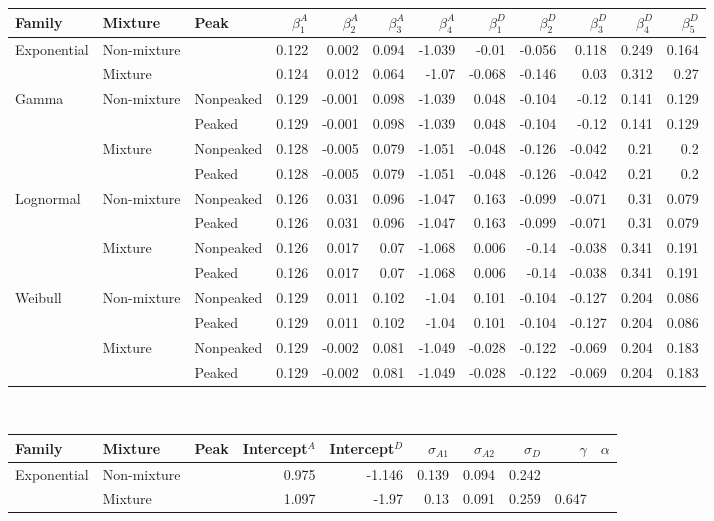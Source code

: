 \documentclass[useAMS,usenatbib,referee,12pt]{article}
\begin{document}
\begin{table}\footnotesize
\centering
\begin{tabular}{lll|rrrr|rrrrr}
  \hline
Family & Mixture & Peak & $\beta^A_1$ & $\beta^A_2$ & $\beta^A_3$ & $\beta^A_4$ & $\beta^D_1$ & $\beta^D_2$ & $\beta^D_3$ & $\beta^D_4$ & $\beta^D_5$  \\
  \hline
Exponential & Non-mixture & &0.122&0.002&0.094&-1.039&-0.01&-0.056&0.118&0.249&0.164 \\
& Mixture & &0.124&0.012&0.064&-1.07&-0.068&-0.146&0.03&0.312&0.27 \\
Gamma & Non-mixture & Nonpeaked &0.129&-0.001&0.098&-1.039&0.048&-0.104&-0.12&0.141&0.129 \\
& & Peaked &0.129&-0.001&0.098&-1.039&0.048&-0.104&-0.12&0.141&0.129 \\
& Mixture & Nonpeaked &0.128&-0.005&0.079&-1.051&-0.048&-0.126&-0.042&0.21&0.2 \\
& & Peaked &0.128&-0.005&0.079&-1.051&-0.048&-0.126&-0.042&0.21&0.2 \\
Lognormal & Non-mixture & Nonpeaked &0.126&0.031&0.096&-1.047&0.163&-0.099&-0.071&0.31&0.079 \\
& & Peaked &0.126&0.031&0.096&-1.047&0.163&-0.099&-0.071&0.31&0.079 \\
& Mixture & Nonpeaked &0.126&0.017&0.07&-1.068&0.006&-0.14&-0.038&0.341&0.191 \\
& & Peaked &0.126&0.017&0.07&-1.068&0.006&-0.14&-0.038&0.341&0.191 \\
Weibull & Non-mixture & Nonpeaked &0.129&0.011&0.102&-1.04&0.101&-0.104&-0.127&0.204&0.086 \\
& & Peaked &0.129&0.011&0.102&-1.04&0.101&-0.104&-0.127&0.204&0.086 \\
& Mixture & Nonpeaked &0.129&-0.002&0.081&-1.049&-0.028&-0.122&-0.069&0.204&0.183 \\
& & Peaked &0.129&-0.002&0.081&-1.049&-0.028&-0.122&-0.069&0.204&0.183 \\
  \hline
\end{tabular}\\
\vspace{1.25cm}
\begin{tabular}{ll|lrrrrrrr}
  \hline
Family & Mixture & Peak & Intercept$^A$ & Intercept$^D$ & $\sigma_{A1}$ & $\sigma_{A2}$ & $\sigma_D$ & $\gamma$ & $\alpha$ \\
\hline
Exponential & Non-mixture & &0.975&-1.146&0.139&0.094&0.242& & \\
& Mixture & &1.097&-1.97&0.13&0.091&0.259&0.647& \\

\end{tabular}
\end{table}
\end{document}
